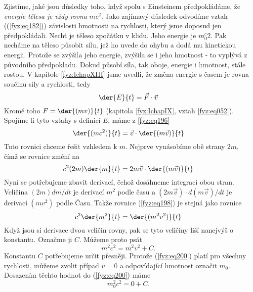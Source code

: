     Zjistíme, jaké jsou důsledky toho, když spolu s Einsteinem předpokládáme, že \emph{energie 
    tělesa je vždy rovna \(mc^2\)}. Jako zajímavý důsledek odvodíme vztah ((\ref{fyz:eq182})) 
    závislosti hmotnosti na rychlosti, který jsme doposud jen předpokládali. Nechť je těleso 
    zpočátku v klidu. Jeho energie je \(m_0^c2\). Pak necháme na těleso působit sílu, jež ho uvede 
    do ohybu a dodá mu kinetickou energii. Protože se zvýšila jeho energie, zvýšila se i jeho 
    hmotnost - to vyplývá z původního předpokladu. Dokud působí síla, tak oboje, energie i 
    hmotnost, stále rostou. V kapitole \ref{fyz:IchapXIII} jsme uvedli, že změna energie s 
    časem je rovna součinu síly a rychlosti, tedy
    \begin{equation}\label{fyz:eq196}
      \der{E}{t} = \vec{F}\cdot\vec{v}
    \end{equation}
    Kromě toho \(F=\der{(mv)}{t}\) (kapitola \ref{fyz:IchapIX}, vztah \ref{fyz:eq052}). 
    Spojíme-li tyto vztahy s definicí \(E\), máme z \ref{fyz:eq196}
    \begin{equation}\label{fyz:eq197}
      \der{(mc^2)}{t} = \vec{v}\cdot\der{(m\vec{v})}{t}
    \end{equation}
    Tuto rovnici chceme řešit vzhledem k \(m\). Nejprve vynásobíme obě strany \(2m\), čímž se 
    rovnice změní na
    \begin{equation}\label{fyz:eq198}
      c^2(2m)\der{m}{t} = 2m\vec{v}\cdot\der{(m\vec{v})}{t}
    \end{equation}
    Nyní se potřebujeme zbavit derivací, čehož dosáhneme integrací obou stran. Veličina \((2m) 
    dm/dt\) je derivací \(m^2\) podle času a \((2m\vec{v})\cdot d(m\vec{v})/dt\) je derivací 
    \((mv^2)\) podle Času. Takže rovnice (\ref{fyz:eq198}) je stejná jako rovnice 
    \begin{equation}\label{fyz:eq199}
      c^2\der{m^2}{t} = \der{(m^2v^2)}{t}
    \end{equation}
    Když jsou si derivace dvou veličin rovny, pak se tyto veličiny liší nanejvýš o konstantu. 
    Označme ji \(C\). Můžeme proto psát
    \begin{equation}\label{fyz:eq200}
      m^2c^2 = m^2v^2 + C.
    \end{equation}
    Konstantu \(C\) potřebujeme určit přesněji. Protože (\ref{fyz:eq200}) platí pro všechny 
    rychlosti, můžeme zvolit případ \(v = 0\) a odpovídající hmotnost označit \(m_0\). Dosazením 
    těchto hodnot do (\ref{fyz:eq200}) máme
    \begin{equation}\label{fyz:eq201}
      m_0^2c^2 = 0 + C.
    \end{equation}
